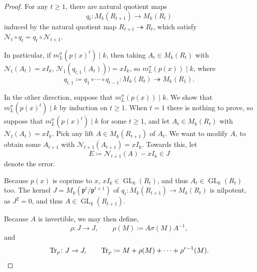 \documentclass[10pt, reqno, hidelinks]{amsart}
\DeclareMathOperator{\GL}{GL}
\newcommand{\sN}{{\mathcal N}}
\newcommand{\fp}{{\mathfrak p}}
\numberwithin{thm}{subsection}
\theoremstyle{definition}
\begin{document}
\begin{proof}
	For any $t \geq 1$, there are natural quotient maps
	\[
	q_t \colon M_k(R_{t+1}) \rightarrow M_k(R_t)
	\]
	induced by the natural quotient map $R_{t+1} \twoheadrightarrow R_t$, which satisfy $\sN_t \circ q_t = q_t \circ \sN_{t+1}$. 

	In particular, if $m_L^{\sigma}(p(x)^t) \mid k$, then taking $A_t \in M_{k}(R_t)$ with $\sN_{t}(A_t) = x I_k$, $\sN_1(q_{t,1}(A_t))) = x I_k$, so $m_L^{\sigma}(p(x)) \mid k$, where
	\[
		q_{t,1} \coloneqq q_1 \circ \cdots \circ q_{t-1} \colon M_k(R_t) \twoheadrightarrow M_k(R_1).
	\]

	In the other direction, suppose that $m_L^{\sigma}(p(x)) \mid k$. We show that $m_L^{\sigma}(p(x)^t) \mid k$ by induction on $t \geq 1$. When $t = 1$ there is nothing to prove, so suppose that $m_L^{\sigma}(p(x)^t) \mid k$ for some $t \geq 1$, and let $A_t \in M_{k}(R_t)$ with $\sN_{t}(A_t) = x I_k$. Pick any lift $A \in M_k(R_{t+1})$ of $A_t$. We want to modify $A$, to obtain some $A_{t+1}$ with $\sN_{t+1}(A_{t+1}) = x I_k$. Towards this, let
	\[
		E \coloneqq \sN_{t+1}(A) - x I_k \in J
	\]
	denote the error. 
	
	Because $p(x)$ is coprime to $x$, $x I_k \in \GL_k(R_t)$, and thus $A_t \in \GL_k(R_t)$ too. The kernel $J = M_k(\fp^t / \fp^{t+1})$ of $q_t \colon M_k(R_{t+1}) \rightarrow M_k(R_t)$ is nilpotent, as $J^2 = 0$, and thus $A \in \GL_k(R_{t+1})$.
	
	Because $A$ is invertible, we may then define,
	\[
	\rho \colon J \rightarrow J, \qquad \rho(M) \coloneqq A \sigma(M) A^{-1},
	\]
	and 
	\[
	\Tr_{\rho} \colon J \rightarrow J, \qquad \Tr_{\rho} \coloneqq M + \rho(M) + \cdots + \rho^{r-1}(M).
	\]


\end{proof}
\end{document}

